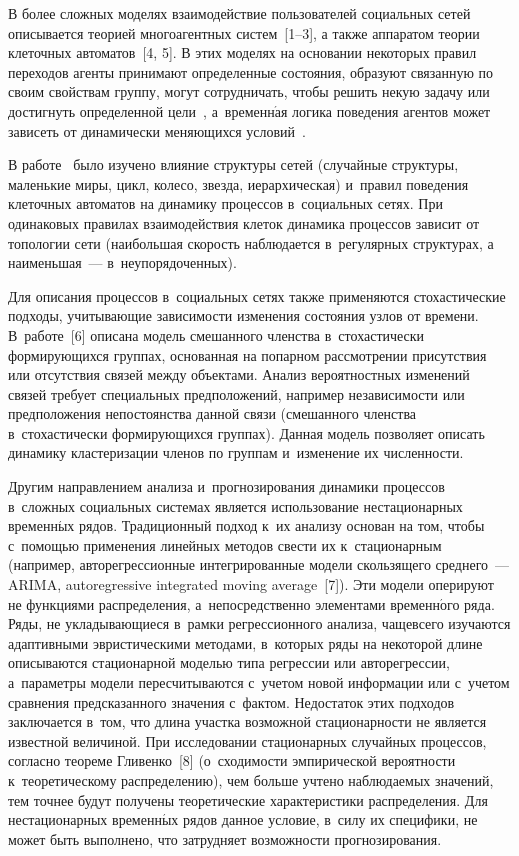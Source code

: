 \begin{multicols}{2}
  В более сложных моделях взаимодействие пользователей социальных сетей 
описывается теорией многоагентных систем~[1--3], а также аппаратом теории 
клеточных автоматов~[4, 5]. В этих моделях на основании некоторых правил 
переходов агенты принимают определенные состояния, образуют связанную по 
своим свойствам группу, могут сотрудничать, чтобы решить некую задачу или 
достигнуть определенной цели~\cite{1-hv}, а~временн$\acute{\mbox{а}}$я логика поведения 
агентов может зависеть от динамически меняющихся условий~\cite{2-hv}.
  
  В работе~\cite{4-hv} было изучено влияние структуры сетей (случайные 
структуры, маленькие миры, цикл, колесо, звезда, иерархическая) и~правил 
поведения клеточных автоматов на динамику процессов в~социальных сетях. 
При одинаковых правилах взаимодействия клеток динамика процессов зависит 
от топологии сети (наибольшая скорость наблюдается в~регулярных 
структурах, а наименьшая~--- в~неупорядоченных).
  
  Для описания процессов в~социальных сетях также применяются 
стохастические подходы, учитывающие зависимости изменения состояния 
узлов от времени. В~работе~[6] описана модель смешанного членства 
в~стохастически формирующихся группах, основанная на попарном 
рассмотрении присутствия или отсутствия связей между объектами. Анализ 
вероятностных изменений связей требует специальных предположений, 
например независимости или предположения непостоянства данной связи 
(смешанного членства в~стохастически формирующихся группах). Данная 
модель позволяет описать динамику кластеризации членов по группам 
и~изменение их численности.
  
  Другим направлением анализа и~прогнозирования динамики процессов 
в~сложных социальных системах является использование нестационарных 
временн$\acute{\mbox{ы}}$х рядов. Традиционный подход к~их анализу основан на том, чтобы 
с~помощью применения линейных методов свести их к~стационарным 
(например, авторегрессионные интегрированные модели скользящего 
среднего~--- ARIMA, autoregressive integrated moving average~[7]). Эти модели оперируют не функциями 
распределения, а~непосредственно элементами временн$\acute{\mbox{о}}$го ряда. Ряды, не 
укла\-ды\-ва\-ющи\-еся в~рамки регрессионного анализа, чаще\linebreak всего изучаются 
адаптивными эвристическими методами, в~которых ряды на некоторой длине 
описываются стационарной моделью типа регрессии или авторегрессии, 
а~параметры модели пересчитываются с~учетом новой информации или 
с~учетом сравнения предсказанного значения с~фактом. Недостаток этих 
подходов заключается в~том, что длина участка возможной стационарности не 
является известной величиной. При исследовании стационарных случайных 
процессов, согласно теореме Гливенко~[8] (о~сходимости эмпирической 
вероятности к~теоретическому распределению), чем больше учтено 
наблюдаемых значений, тем точнее будут получены теоретические 
характеристики распределения. Для нестационарных временн$\acute{\mbox{ы}}$х рядов данное 
условие, в~силу их специфики, не может быть выполнено, что затрудняет 
возможности прогнозирования.
  

\end{multicols}
